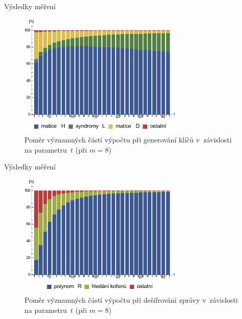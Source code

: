 \documentclass{beamer}
\begin{document}
\begin{frame}{Výsledky měření}

    \begin{figure}[!ht]
        \centering
        \includegraphics[width=0.7\textwidth]{../../implementace/grafy/chart_m8_generovani.pdf}
        \caption[Poměr částí výpočtu při generování klíčů]{
            Poměr významných částí výpočtu při generování klíčů v~závislosti na
            parametru~$t$ (při $m=8$)
        }
        \label{obr_mereni_pomer_gen}
    \end{figure}

\end{frame}

\begin{frame}{Výsledky měření}

    \begin{figure}[!ht]
        \centering
        \includegraphics[width=0.7\textwidth]{../../implementace/grafy/chart_m8_desifrovani.pdf}
        \caption[Poměr částí výpočtu při dešifrování]{
            Poměr významných částí výpočtu při dešifrování zprávy v~závislosti na
            parametru~$t$ (při $m=8$)
        }
        \label{obr_mereni_pomer_desifr}
    \end{figure}

\end{frame}
\end{document}

